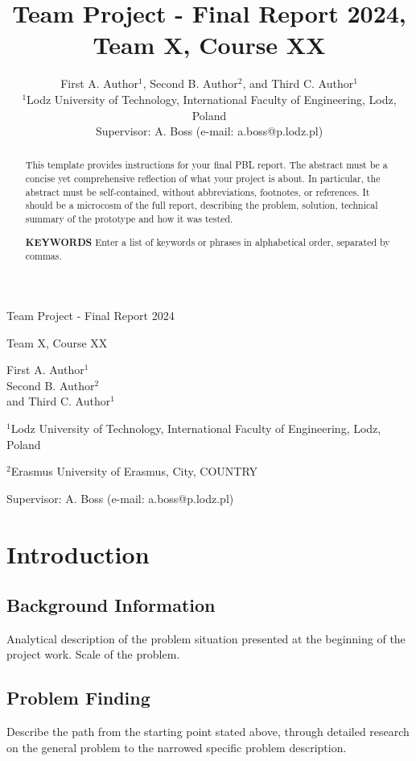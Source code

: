 \documentclass{article}
\title{Team Project - Final Report 2024, Team X, Course XX}
\author{First A. Author$^1$, Second B. Author$^2$, and Third C. Author$^1$ \\
$^1$Lodz University of Technology, International Faculty of Engineering, Lodz, Poland \\
Supervisor: A. Boss (e-mail: a.boss@p.lodz.pl)}
\date{}
\begin{document}
\begin{titlepage}
\centering
\vspace*{\fill}
{\LARGE Team Project - Final Report 2024 \par}
\vspace{1cm}
{\Large Team X, Course XX \par}
\vspace{2cm}
{\LARGE First A. Author$^1$ \\ Second B. Author$^2$ \\ and Third C. Author$^1$ \par}
\vspace{0.5cm}
{\large $^1$Lodz University of Technology, International Faculty of Engineering, Lodz, Poland \par}
{\large $^2$Erasmus University of Erasmus, City, COUNTRY \par}
\vspace{0.5cm}
{\large Supervisor: A. Boss (e-mail: a.boss@p.lodz.pl) \par}
\vspace*{\fill}
\end{titlepage}

\begin{abstract}
This template provides instructions for your final PBL report. The abstract must be a concise yet comprehensive reflection of what your project is about. In particular, the abstract must be self-contained, without abbreviations, footnotes, or references. It should be a microcosm of the full report, describing the problem, solution, technical summary of the prototype and how it was tested.

\textbf{KEYWORDS} Enter a list of keywords or phrases in alphabetical order, separated by commas.
\end{abstract}

\section{Introduction}

\subsection{Background Information}
Analytical description of the problem situation presented at the beginning of the project work. Scale of the problem.

\subsection{Problem Finding}
Describe the path from the starting point stated above, through detailed research on the general problem to the narrowed specific problem description.
\end{document}
